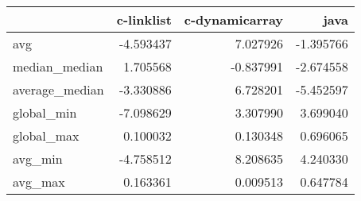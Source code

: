 \begin{tabular}{lrrr}
\toprule
{} &  c-linklist &  c-dynamicarray &      java \\
\midrule
avg            &   -4.593437 &        7.027926 & -1.395766 \\
median\_median  &    1.705568 &       -0.837991 & -2.674558 \\
average\_median &   -3.330886 &        6.728201 & -5.452597 \\
global\_min     &   -7.098629 &        3.307990 &  3.699040 \\
global\_max     &    0.100032 &        0.130348 &  0.696065 \\
avg\_min        &   -4.758512 &        8.208635 &  4.240330 \\
avg\_max        &    0.163361 &        0.009513 &  0.647784 \\
\bottomrule
\end{tabular}
